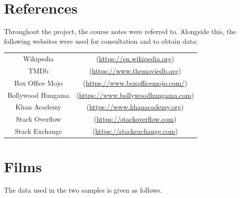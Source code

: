 \documentclass{article}
\begin{document}
\section{References}
Throughout the project, the course notes were referred to. Alongside this, the following websites were used for consultation and to obtain data:\\
\begin{center}\begin{tabular}{ @{}c@{}c@{} }
Wikipedia&\quad(\url{https://en.wikipedia.org})\\
TMDb&\quad(\url{https://www.themoviedb.org})\\
Box Office Mojo&\quad(\url{https://www.boxofficemojo.com/})\\
Bollywood Hungama&\quad(\url{https://www.bollywoodhungama.com})\\
Khan Academy&\quad(\url{https://www.khanacademy.org})\\
Stack Overflow&\quad(\url{https://stackoverflow.com})\\
Stack Exchange&\quad(\url{https://stackexchange.com})
\end{tabular}\end{center}
\label{sec:ref}
\newpage
\appendix
\section{Films}
The data used in the two samples is given as follows.
\end{document}
